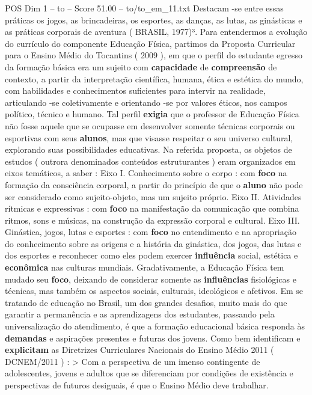 \begin{textsample}{POS Dim 1 – to – Score 51.00 – to/to\_em\_11.txt}
Destacam -se entre essas práticas os jogos, as brincadeiras, os esportes, as danças, as lutas, as ginásticas e as práticas corporais de aventura ( BRASIL, 1977)³.
Para entendermos a evolução do currículo do componente Educação Física, partimos da Proposta Curricular para o Ensino Médio do Tocantins ( 2009 ), em que o perfil do estudante egresso da formação básica era um sujeito com \textbf{capacidade} de \textbf{compreensão} de contexto, a partir da interpretação científica, humana, ética e estética do mundo, com habilidades e conhecimentos suficientes para intervir na realidade, articulando -se coletivamente e orientando -se por valores éticos, nos campos político, técnico e humano.
Tal perfil \textbf{exigia} que o professor de Educação Física não fosse aquele que se ocupasse em desenvolver somente técnicas corporais ou esportivas com seus \textbf{alunos}, mas que visasse respeitar o seu universo cultural, explorando suas possibilidades educativas.
Na referida proposta, os objetos de estudos ( outrora denominados conteúdos estruturantes ) eram organizados em eixos temáticos, a saber : Eixo I.
Conhecimento sobre o corpo : com \textbf{foco} na formação da consciência corporal, a partir do princípio de que o \textbf{aluno} não pode ser considerado como sujeito-objeto, mas um sujeito próprio.
Eixo II.
Atividades rítmicas e expressivas : com \textbf{foco} na manifestação da comunicação que combina ritmos, sons e músicas, na construção da expressão corporal e cultural.
Eixo III.
Ginástica, jogos, lutas e esportes : com \textbf{foco} no entendimento e na apropriação do conhecimento sobre as origens e a história da ginástica, dos jogos, das lutas e dos esportes e reconhecer como eles podem exercer \textbf{influência} social, estética e \textbf{econômica} nas culturas mundiais.
Gradativamente, a Educação Física tem mudado seu \textbf{foco}, deixando de considerar somente as \textbf{influências} fisiológicas e técnicas, mas também os aspectos sociais, culturais, ideológicos e afetivos.
Em se tratando de educação no Brasil, um dos grandes desafios, muito mais do que garantir a permanência e as aprendizagens dos estudantes, passando pela universalização do atendimento, é que a formação educacional básica responda às \textbf{demandas} e aspirações presentes e futuras dos jovens.
Como bem identificam e \textbf{explicitam} as Diretrizes Curriculares Nacionais do Ensino Médio 2011 ( DCNEM/2011 ) : > Com a perspectiva de um imenso contingente de adolescentes, jovens e adultos que se diferenciam por condições de existência e perspectivas de futuros desiguais, é que o Ensino Médio deve trabalhar.

\end{textsample}
